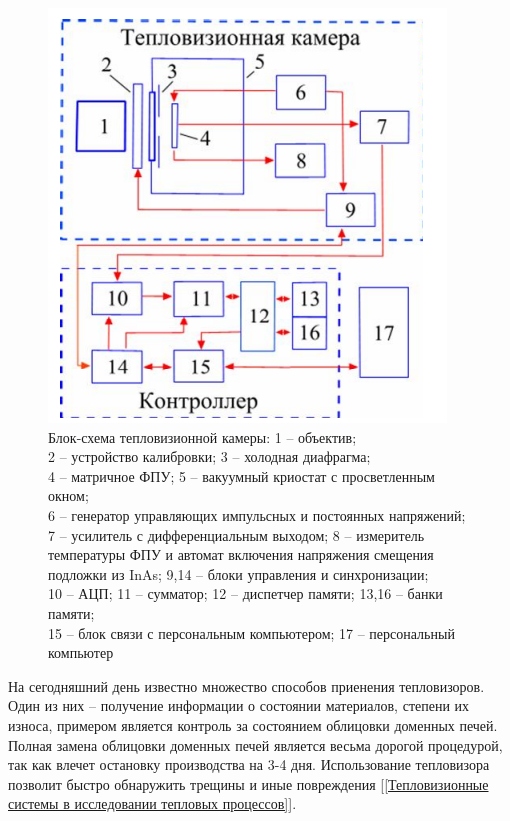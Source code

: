 \documentclass[14pt, a4paper]{extreport}
\begin{document}
	\begin{figure}[h!]
		\centering
		\includegraphics[width = \textwidth]{image/chapter_1/MatrixIRCameraScheme}	
		\caption{Блок-схема тепловизионной камеры: 1 -- объектив;\\2 -- устройство калибровки; 3 -- холодная диафрагма;\\4 -- матричное ФПУ; 5 -- вакуумный криостат с просветленным окном;\\6 -- генератор управляющих импульсных и постоянных напряжений;\\7 -- усилитель с дифференциальным выходом; 8 -- измеритель температуры ФПУ и автомат включения напряжения смещения подложки из InAs; 9,14 -- блоки управления и синхронизации;\\10 -- АЦП; 11 -- сумматор; 12 -- диспетчер памяти; 13,16 -- банки памяти;\\15 -- блок связи с персональным компьютером; 17 -- персональный компьютер}
		\label{fig:MatrixIRCameraScheme}
	\end{figure}

	На сегодняшний день известно множество способов приенения тепловизоров. Один из них -- получение информации о состоянии материалов, степени их износа, примером является контроль за состоянием облицовки доменных печей. Полная замена облицовки доменных печей является весьма дорогой процедурой, так как влечет остановку производства на 3-4 дня. Использование тепловизора позволит быстро обнаружить трещины и иные повреждения [\ref{Тепловизионные системы в исследовании тепловых процессов}].
	
\end{document}
